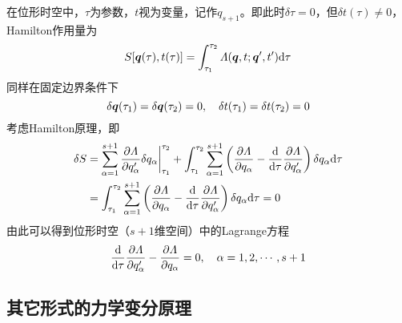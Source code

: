 在位形时空中，$\tau$为参数，$t$视为变量，记作$q_{s+1}$。即此时$\delta \tau = 0$，但$\delta t(\tau) \neq 0$，Hamilton作用量为
\begin{equation*}
	S[\boldsymbol{q}(\tau),t(\tau)] = \int_{\tau_1}^{\tau_2} \mathnormal{\Lambda}(\boldsymbol{q},t;\boldsymbol{q}',t') \mathrm{d} \tau
\end{equation*}
同样在固定边界条件下
\begin{equation*}
	\delta \boldsymbol{q}(\tau_1) = \delta \boldsymbol{q}(\tau_2) = 0,\quad \delta t(\tau_1) = \delta t(\tau_2) = 0
\end{equation*}
考虑Hamilton原理，即
\begin{align*}
	\delta S & = \sum_{\alpha=1}^{s+1} \frac{\partial \mathnormal{\Lambda}}{\partial q'_\alpha} \delta q_\alpha\bigg|_{\tau_1}^{\tau_2} + \int_{\tau_1}^{\tau_2} \sum_{\alpha=1}^{s+1} \left(\frac{\partial \mathnormal{\Lambda}}{\partial q_\alpha} - \frac{\mathrm{d}}{\mathrm{d} \tau} \frac{\partial \mathnormal{\Lambda}}{\partial q'_\alpha}\right) \delta q_\alpha \mathrm{d} \tau \\
	& = \int_{\tau_1}^{\tau_2} \sum_{\alpha=1}^{s+1} \left(\frac{\partial \mathnormal{\Lambda}}{\partial q_\alpha} - \frac{\mathrm{d}}{\mathrm{d} \tau} \frac{\partial \mathnormal{\Lambda}}{\partial q'_\alpha}\right) \delta q_\alpha \mathrm{d} \tau = 0
\end{align*}
由此可以得到位形时空（$s+1$维空间）中的Lagrange方程
\begin{equation}
	\frac{\mathrm{d}}{\mathrm{d} \tau} \frac{\partial \mathnormal{\Lambda}}{\partial q'_\alpha} - \frac{\partial \mathnormal{\Lambda}}{\partial q_\alpha} = 0,\quad \alpha = 1,2,\cdots,s+1
\end{equation}

\subsection{其它形式的力学变分原理}


